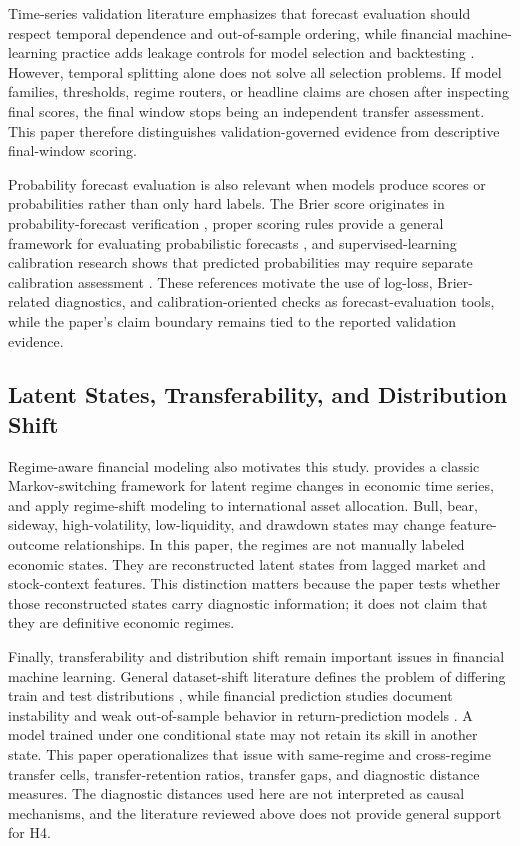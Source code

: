 \documentclass[12pt,a4paper]{article}
\begin{document}
Time-series validation literature emphasizes that forecast evaluation should respect temporal dependence and out-of-sample ordering, while financial machine-learning practice adds leakage controls for model selection and backtesting \citep{BergmeirBenitez2012,LopezDePrado2018}. However, temporal splitting alone does not solve all selection problems. If model families, thresholds, regime routers, or headline claims are chosen after inspecting final scores, the final window stops being an independent transfer assessment. This paper therefore distinguishes validation-governed evidence from descriptive final-window scoring.

Probability forecast evaluation is also relevant when models produce scores or probabilities rather than only hard labels. The Brier score originates in probability-forecast verification \citep{Brier1950}, proper scoring rules provide a general framework for evaluating probabilistic forecasts \citep{GneitingRaftery2007}, and supervised-learning calibration research shows that predicted probabilities may require separate calibration assessment \citep{NiculescuMizilCaruana2005}. These references motivate the use of log-loss, Brier-related diagnostics, and calibration-oriented checks as forecast-evaluation tools, while the paper's claim boundary remains tied to the reported validation evidence.

\subsection{Latent States, Transferability, and Distribution Shift}

Regime-aware financial modeling also motivates this study. \citet{Hamilton1989} provides a classic Markov-switching framework for latent regime changes in economic time series, and \citet{AngBekaert2002} apply regime-shift modeling to international asset allocation. Bull, bear, sideway, high-volatility, low-liquidity, and drawdown states may change feature-outcome relationships. In this paper, the regimes are not manually labeled economic states. They are reconstructed latent states from lagged market and stock-context features. This distinction matters because the paper tests whether those reconstructed states carry diagnostic information; it does not claim that they are definitive economic regimes.

Finally, transferability and distribution shift remain important issues in financial machine learning. General dataset-shift literature defines the problem of differing train and test distributions \citep{QuinoneroCandelaEtAl2008}, while financial prediction studies document instability and weak out-of-sample behavior in return-prediction models \citep{PayeTimmermann2006,WelchGoyal2008}. A model trained under one conditional state may not retain its skill in another state. This paper operationalizes that issue with same-regime and cross-regime transfer cells, transfer-retention ratios, transfer gaps, and diagnostic distance measures. The diagnostic distances used here are not interpreted as causal mechanisms, and the literature reviewed above does not provide general support for H4.
\end{document}
